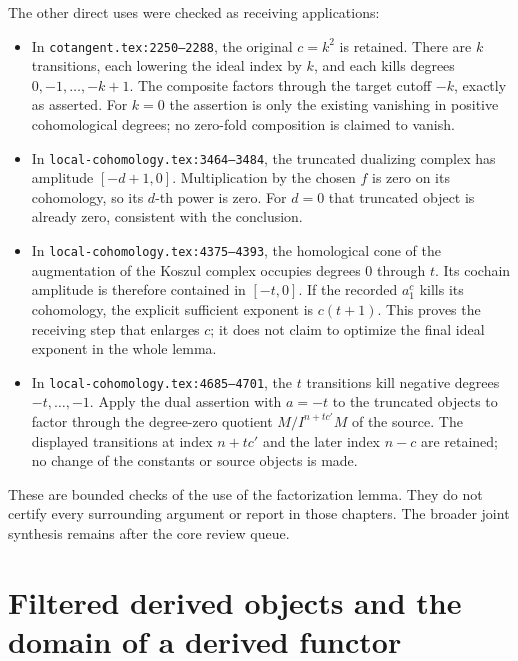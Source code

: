 \documentclass[11pt]{article}
\providecommand{\tightlist}{\setlength{\itemsep}{0pt}\setlength{\parskip}{0pt}}
\begin{document}
The other direct uses were checked as receiving applications:\allowbreak{}

\begin{itemize}
\tightlist
\item
  In \texttt{cotangent.\allowbreak{}tex:\allowbreak{}2250–\allowbreak{}2288},\allowbreak{} the original \(c=k^2\) is retained. There are \(k\) transitions,\allowbreak{} each lowering the ideal index by \(k\),\allowbreak{} and each kills degrees \(0,-1,\ldots,-k+1\). The composite factors through the target cutoff \(-k\),\allowbreak{} exactly as asserted. For \(k=0\) the assertion is only the existing vanishing in positive cohomological degrees; no zero-fold composition is claimed to vanish.
\item
  In \texttt{local-\allowbreak{}cohomology.\allowbreak{}tex:\allowbreak{}3464–\allowbreak{}3484},\allowbreak{} the truncated dualizing complex has amplitude \([-d+1,0]\). Multiplication by the chosen \(f\) is zero on its cohomology,\allowbreak{} so its \(d\)-th power is zero. For \(d=0\) that truncated object is already zero,\allowbreak{} consistent with the conclusion.
\item
  In \texttt{local-\allowbreak{}cohomology.\allowbreak{}tex:\allowbreak{}4375–\allowbreak{}4393},\allowbreak{} the homological cone of the augmentation of the Koszul complex occupies degrees \(0\) through \(t\). Its cochain amplitude is therefore contained in \([-t,0]\). If the recorded \(a_1^c\) kills its cohomology,\allowbreak{} the explicit sufficient exponent is \(c(t+1)\). This proves the receiving step that enlarges \(c\); it does not claim to optimize the final ideal exponent in the whole lemma.
\item
  In \texttt{local-\allowbreak{}cohomology.\allowbreak{}tex:\allowbreak{}4685–\allowbreak{}4701},\allowbreak{} the \(t\) transitions kill negative degrees \(-t,\ldots,-1\). Apply the dual assertion with \(a=-t\) to the truncated objects to factor through the degree-zero quotient \(M/I^{n+tc'}M\) of the source. The displayed transitions at index \(n+tc'\) and the later index \(n-c\) are retained; no change of the constants or source objects is made.
\end{itemize}

These are bounded checks of the use of the factorization lemma. They do not certify every surrounding argument or report in those chapters. The broader joint synthesis remains after the core review queue.
\clearpage
\section{Filtered derived objects and the domain of a derived functor}\label{proofs-4166-5089-filtered-derived-objects-and-the-domain-of-a-derived-functor}
\end{document}
